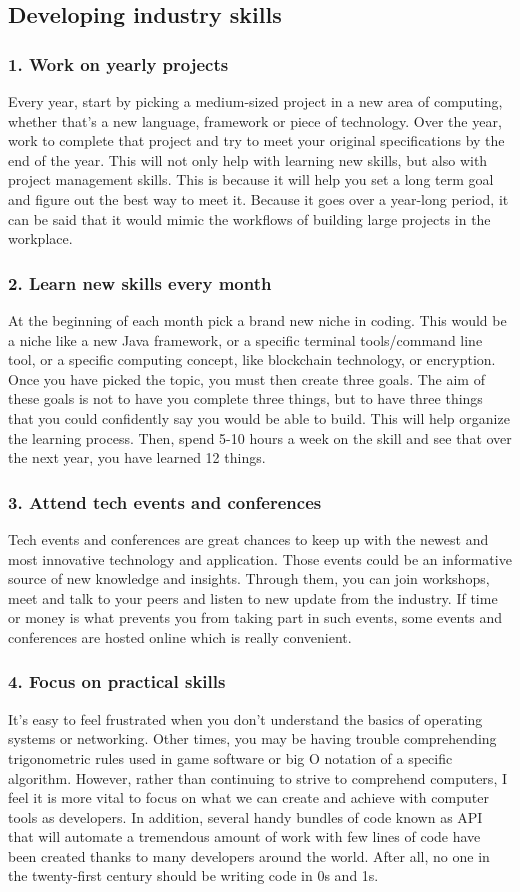 \documentclass[a4paper, 11pt]{report}
\begin{document}
\subsection{Developing industry skills}
    \subsubsection{1. Work on yearly projects}
    Every year, start by picking a medium-sized project in a new area of computing, whether that’s a new language, framework or piece of technology. Over the year, work to complete that project and try to meet your original specifications by the end of the year. This will not only help with learning new skills, but also with project management skills. This is because it will help you set a long term goal and figure out the best way to meet it. Because it goes over a year-long period, it can be said that it would mimic the workflows of building large projects in the workplace.
    \subsubsection{2. Learn new skills every month}
    At the beginning of each month pick a brand new niche in coding. This would be a niche like a new Java framework, or a specific terminal tools/command line tool, or a specific computing concept, like blockchain technology, or encryption. Once you have picked the topic, you must then create three goals. The aim of these goals is not to have you complete three things, but to have three things that you could confidently say you would be able to build. This will help organize the learning process. Then, spend 5-10 hours a week on the skill and see that over the next year, you have learned 12 things.
    \subsubsection{3. Attend tech events and conferences}
    Tech events and conferences are great chances to keep up with the newest and most innovative technology and application. Those events could be an informative source of new knowledge and insights. Through them, you can join workshops, meet and talk to your peers and listen to new update from the industry. If time or money is what prevents you from taking part in such events, some events and conferences are hosted online which is really convenient.
    \subsubsection{4. Focus on practical skills}
    It's easy to feel frustrated when you don't understand the basics of operating systems or networking. Other times, you may be having trouble comprehending trigonometric rules used in game software or big O notation of a specific algorithm. However, rather than continuing to strive to comprehend computers, I feel it is more vital to focus on what we can create and achieve with computer tools as developers. In addition, several handy bundles of code known as API that will automate a tremendous amount of work with few lines of code have been created thanks to many developers around the world. After all, no one in the twenty-first century should be writing code in 0s and 1s.
\end{document}
